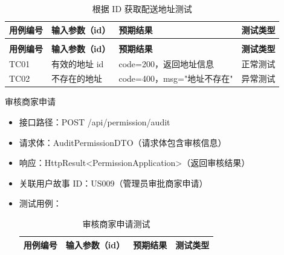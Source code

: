\begin{levellist}
\begin{levellist}
\begin{itemize}
\begin{longtable}{>{\centering\arraybackslash}m{1.7cm} >{\centering\arraybackslash}m{3cm} >{\centering\arraybackslash}m{6.3cm} >{\centering\arraybackslash}m{2cm}}
                      \caption{根据 ID 获取配送地址测试} \label{tab:training}                            \\

                      \toprule
                      \textbf{用例编号} & \textbf{输入参数（id）} & \textbf{预期结果}        & \textbf{测试类型} \\
                      \midrule
                      \endfirsthead

                      \multicolumn{4}{c}{{\tablename\ \thetable{} 续表}}                         \\
                      \toprule
                      \textbf{用例编号} & \textbf{输入参数（id）} & \textbf{预期结果}        & \textbf{测试类型} \\
                      \midrule
                      \endhead

                      \bottomrule
                      \endfoot

                      TC01          & 有效的地址 id          & code=200，返回地址信息      & 正常测试          \\
                      TC02          & 不存在的地址            & code=400，msg="地址不存在" & 异常测试          \\
                  \end{longtable}
        \end{itemize}

        \item 审核商家申请
        \begin{itemize}
            \item 接口路径：POST /api/permission/audit
            \item 请求体：AuditPermissionDTO（请求体包含审核信息）
            \item 响应：HttpResult<PermissionApplication>（返回审核结果）
            \item 关联用户故事 ID：US009（管理员审批商家申请）
            \item 测试用例：
                  \begin{longtable}{>{\centering\arraybackslash}m{1.7cm} >{\centering\arraybackslash}m{3cm} >{\centering\arraybackslash}m{6.3cm} >{\centering\arraybackslash}m{2cm}}

                      \caption{审核商家申请测试} \label{tab:training}                                 \\

                      \toprule
                      \textbf{用例编号} & \textbf{输入参数（id）} & \textbf{预期结果}       & \textbf{测试类型} \\
                      \midrule
                      \endfirsthead


\end{longtable}
\end{itemize}
\end{levellist}
\end{levellist}
